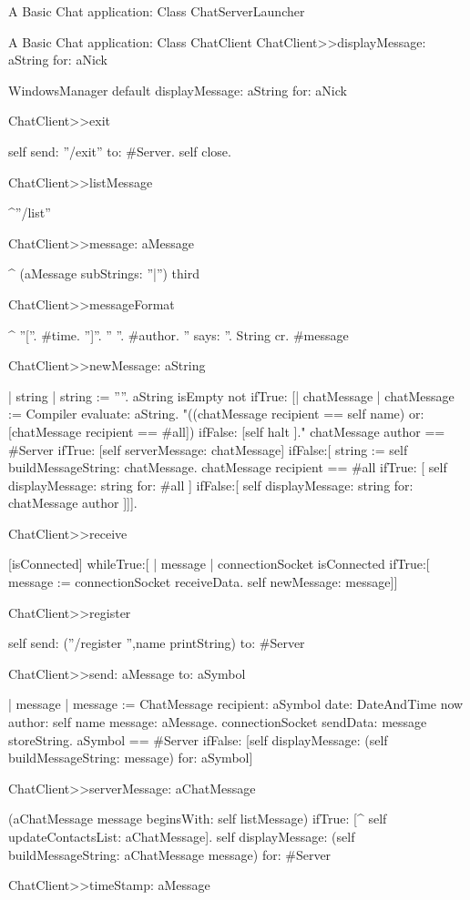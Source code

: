 \documentclass[a4paper,10pt,twoside]{book}
\begin{document}
\begin{script}{A Basic Chat application: Class ChatServerLauncher}
\begin{classdef}{A Basic Chat application: Class ChatClient}
ChatClient>>displayMessage: aString for: aNick

	WindowsManager default displayMessage: aString for: aNick
	

ChatClient>>exit
	
	self send: ''/exit'' to: #Server.
	self close.

ChatClient>>listMessage

	^''/list''

ChatClient>>message: aMessage

	^ (aMessage subStrings: ''|'') third 

ChatClient>>messageFormat

	^ {''[''. #time. '']''. '' ''. #author. '' says: ''. String cr. #message }

ChatClient>>newMessage: aString

	| string |
	string := ''''.
	aString isEmpty not ifTrue: [| chatMessage |
		chatMessage := Compiler evaluate: aString.
		"((chatMessage recipient == self name) or: [chatMessage recipient == #all])
			ifFalse: [self halt ]."
		chatMessage author == #Server
			ifTrue: [self serverMessage: chatMessage]
			ifFalse:[
				string := self buildMessageString: chatMessage.
				chatMessage recipient == #all
					ifTrue: [ self displayMessage: string for: #all ]
					ifFalse:[ self displayMessage: string for: chatMessage author ]]].

ChatClient>>receive

	[isConnected]
		whileTrue:[
			| message |
			connectionSocket isConnected
				ifTrue:[
					message := connectionSocket receiveData.
					self newMessage: message]]

ChatClient>>register
	
	self send: (''/register '',name printString) to: #Server

ChatClient>>send: aMessage to: aSymbol

	| message |
	message := ChatMessage
					recipient: aSymbol
					date: DateAndTime now
					author: self name
					message: aMessage.
	connectionSocket sendData: message storeString.
	aSymbol == #Server
		ifFalse: [self displayMessage: (self buildMessageString: message) for: aSymbol]

ChatClient>>serverMessage: aChatMessage

	(aChatMessage message beginsWith: self listMessage)
		ifTrue: [^ self updateContactsList: aChatMessage].
	self displayMessage: (self buildMessageString: aChatMessage message) for: #Server

ChatClient>>timeStamp: aMessage


\end{classdef}
\end{script}
\end{document}
